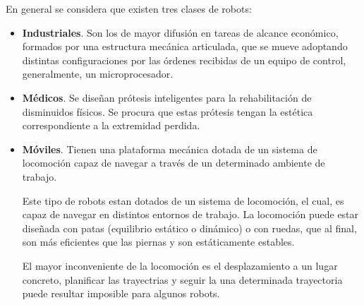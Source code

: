 En general se considera que existen tres clases de robots:
\begin{itemize}
\item \textbf{Industriales}. Son los de mayor difusión en tareas de alcance económico, formados por una estructura mecánica articulada, que se mueve adoptando distintas configuraciones por las órdenes recibidas de un equipo de control, generalmente, un microprocesador.
\item \textbf{Médicos}. Se diseñan prótesis inteligentes para la rehabilitación de disminuidos físicos. Se procura que estas prótesis tengan la estética correspondiente a la extremidad perdida.
\item \textbf{Móviles}. Tienen una plataforma mecánica dotada de un sistema de locomoción capaz de navegar a través de un determinado ambiente de trabajo.

Este tipo de robots estan dotados de un sistema de locomoción, el cual, es capaz de navegar en distintos entornos de trabajo. La locomoción puede estar diseñada con patas (equilibrio estático o dinámico) o con ruedas, que al final, son más eficientes que las piernas y son estáticamente estables. 

El mayor inconveniente de la locomoción es el desplazamiento a un lugar concreto, planificar las trayectrias y seguir la una determinada trayectoria puede resultar imposible para algunos robots.


\end{itemize}
